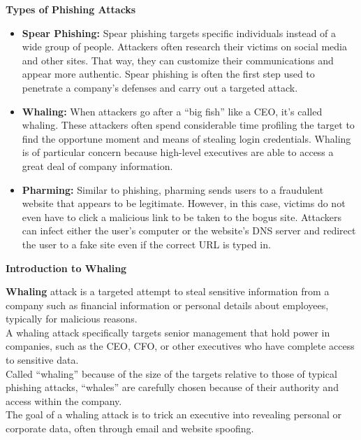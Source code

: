 \documentclass[15pt]{article}
\begin{document}
   \begin{Large} \begin{center}
   \textbf{Types of Phishing Attacks }
  \end{center} \end{Large} 
  \begin{itemize}
 \item \textbf{Spear Phishing:} Spear phishing targets specific individuals instead of a wide group of people. Attackers often research their victims on social media and other sites. That way, they can customize their communications and appear more authentic. Spear phishing is often the first step used to penetrate a company’s defenses and carry out a targeted attack.
 
 \item \textbf{Whaling:} When attackers go after a “big fish” like a CEO, it’s called whaling. These attackers often spend considerable time profiling the target to find the opportune moment and means of stealing login credentials. Whaling is of particular concern because high-level executives are able to access a great deal of company information.
 
 \item \textbf{Pharming:} Similar to phishing, pharming sends users to a fraudulent website that appears to be legitimate. However, in this case, victims do not even have to click a malicious link to be taken to the bogus site. Attackers can infect either the user’s computer or the website’s DNS server and redirect the user to a fake site even if the correct URL is typed in.
 \end{itemize}
         
  \begin{Large} \begin{center}
   \textbf{ Introduction to Whaling }
  \end{center} \end{Large}  
  
  \textbf{Whaling} attack is a targeted attempt to steal sensitive information from a    company such as financial information or personal details about employees, typically for malicious reasons.\\ A whaling attack specifically targets senior management that hold power in companies, such as the CEO, CFO, or other executives who have complete access to sensitive data.\\ Called “whaling” because of the size of the targets relative to those of typical phishing attacks, “whales” are carefully chosen because of their authority and access within the company.\\ The goal of a whaling attack is to trick an executive into revealing personal or corporate data, often through email and website spoofing. \\
  
\end{document}

